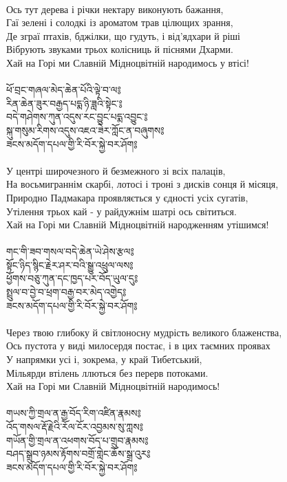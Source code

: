 \\
Ось тут дерева і річки нектару виконують бажання, \\
Гаї зелені і солодкі із ароматом трав цілющих зрання,\\
Де зграї птахів, бджілки, що гудуть, і від'ядхари й ріші\\
Вібрують звуками трьох колісниць й піснями Дхарми.\\
Хай на Горі ми Славній Мідноцвітній народимось у втісі! \\
\\
{\ti ཕོ་བྲང་གཞལ་མེད་ཆེན་པོའི་ལྟེ་བ་ལ༔\\
རིན་ཆེན་ཟུར་བརྒྱད་པདྨ་ཉི་ཟླའི་སྟེང་༔\\
བདེ་གཤེགས་ཀུན་འདུས་རང་བྱུང་པདྨ་འབྱུང་༔\\
སྐུ་གསུམ་རིགས་འདུས་འཇའ་ཟེར་ཀློང་ན་བཞུགས༔\\
ཟངས་མདོག་དཔལ་གྱི་རི་བོར་སྐྱེ་བར་ཤོག༔}\\
\\
У центрі широчезного й безмежного зі всіх палаців,\\
На восьмиграннім скарбі, лотосі і троні з дисків сонця й місяця,\\
Природно Падмакара проявляється у єдності усіх сугатів,\\
Утілення трьох кай - у райдужнім шатрі ось світиться.\\
Хай на Горі ми Славній Мідноцвітній народженням утішимся! \\
\\
{\ti གང་གི་ཟབ་གསལ་བདེ་ཆེན་ཡེ་ཤེས་རྩལ༔\\
སྟོང་ཉིད་སྙིང་རྗེར་ཤར་བའི་སྒྱུ་འཕྲུལ་ལས༔\\
ཕྱོགས་བཅུ་ཀུན་དང་ཁྱད་པར་བོད་ཡུལ་དུ༔\\
སྤྲུལ་བ་བྱེ་བ་ཕྲག་བརྒྱ་བར་མེད་འགྱེད༔\\
ཟངས་མདོག་དཔལ་གྱི་རི་བོར་སྐྱེ་བར་ཤོག༔}\\
\\
\ru
Через твою глибоку й світлоносну мудрість великого блаженства,\\
Ось пустота у виді милосердя постає, і в цих таємних проявах\\
У напрямки усі і, зокрема, у край Тибетський,\\
Мільярди втілень ллються без перерв потоками. \\
Хай на Горі ми Славній Мідноцвітній народимось!\\
\\
{\ti གཡས་ཀྱི་གྲལ་ན་རྒྱ་བོད་རིག་འཛིན་རྣམས༔\\
འོད་གསལ་རྡོ་རྗེའི་རོལ་ངོར་འབྱམས་སུ་ཀླས༔\\
གཡོན་གྱི་གྲལ་ན་འཕགས་བོད་པ་གྲུབ་རྣམས༔\\
བཤད་སྒྲུབ་ཉམས་རྟོགས་བགྲོ་གླེང་ཆོས་སྒྲ་འུར༔\\
ཟངས་མདོག་དཔལ་གྱི་རི་བོར་སྐྱེ་བར་ཤོག༔}\\

